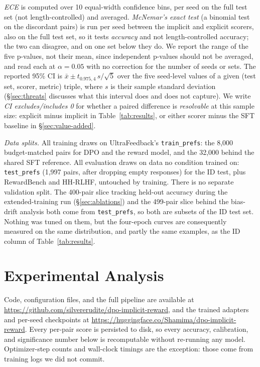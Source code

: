 \documentclass[11pt]{article}
\begin{document}
\emph{ECE} is computed over 10 equal-width confidence bins, per seed on the full test set (not
length-controlled) and averaged. \emph{McNemar's exact test} (a binomial test on the discordant
pairs) is run per seed between the implicit and explicit scorers, also on the full test set, so
it tests \emph{accuracy} and not length-controlled accuracy; the two can disagree, and on one
set below they do. We report the range of the five p-values, not their mean, since independent
p-values should not be averaged, and read each at $\alpha = 0.05$ with no correction for the
number of seeds or sets. The reported 95\%
CI is $\bar x \pm t_{0.975,4}\,s/\sqrt5$ over the five seed-level values of a given (test set,
scorer, metric) triple, where $s$ is their sample standard deviation (\S\ref{sec:threats}
discusses what this interval does and does not capture). We write \emph{CI excludes/includes 0}
for whether a paired difference is \emph{resolvable} at this sample size: explicit minus
implicit in Table~\ref{tab:results}, or either scorer minus the SFT baseline in
\S\ref{sec:value-added}.

\emph{Data splits.} All training draws on UltraFeedback's \texttt{train\_prefs}: the 8,000
budget-matched pairs for DPO and the reward model, and the 32,000 behind the shared SFT
reference. All evaluation draws on data no condition trained on: \texttt{test\_prefs} (1,997
pairs, after dropping empty responses) for the ID test, plus RewardBench and HH-RLHF, untouched
by training. There is no separate validation split. The 400-pair slice tracking held-out accuracy
during the extended-training run (\S\ref{sec:ablations}) and the 499-pair slice behind the
bias-drift analysis both come from \texttt{test\_prefs}, so both are subsets of the ID test set.
Nothing was tuned on them, but the four-epoch curves are consequently measured on the same
distribution, and partly the same examples, as the ID column of Table~\ref{tab:results}.

\section{Experimental Analysis}

\noindent Code, configuration files, and the full pipeline are available at
\url{https://github.com/silvererudite/dpo-implicit-reward}, and the trained adapters and per-seed
checkpoints at \url{https://huggingface.co/Shamima/dpo-implicit-reward}. Every per-pair score is
persisted to disk, so every accuracy, calibration, and significance number below is recomputable
without re-running any model. Optimizer-step counts and wall-clock timings are the exception: those come
from training logs we did not commit.
\end{document}

